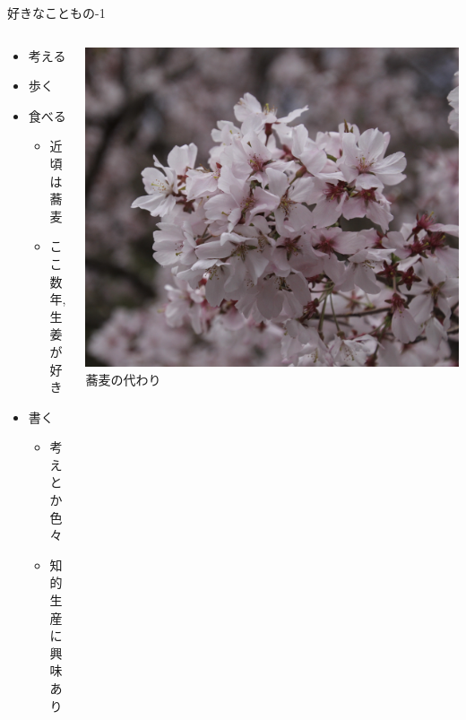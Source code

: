 \documentclass[unicode,12pt,aspectratio=169, dvipdfmx]{beamer}
\begin{document}
    \begin{frame}{好きなこともの-1}
        \begin{columns}
            \begin{column}[]{.5\linewidth}
                \begin{itemize}
                    \item 考える
                    \item 歩く
                    \item 食べる
                    \begin{itemize}
                        \item 近頃は蕎麦
                        \item ここ数年,生姜が好き
                    \end{itemize}
                    \item 書く
                    \begin{itemize}
                        \item 考えとか色々
                        \item 知的生産に興味あり
                    \end{itemize}
                \end{itemize}
            \end{column}
            \begin{column}[]{.5\linewidth}
                \begin{center}
                    \includegraphics[scale=0.05]{figures/sakura1.jpeg}
                    \scriptsize{蕎麦の代わり}
                \end{center}
            \end{column}
        \end{columns}
    \end{frame}
\end{document}
